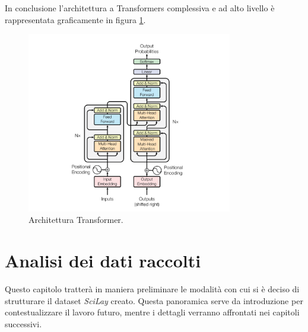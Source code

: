 \documentclass[12pt,a4paper,twoside,openright]{book}
\begin{document}
In conclusione l'architettura a Transformers complessiva e ad alto livello è rappresentata graficamente in figura \ref{fig:transformer}.

\begin{figure} 
    \centering
    \includegraphics[width=0.8\textwidth]{images/transformer.png}
    \caption{Architettura Transformer.}
    \label{fig:transformer}
\end{figure}

































\chapter{Analisi dei dati raccolti}\label{cap:analisi_dati}

Questo capitolo tratterà in maniera preliminare le modalità con cui si è deciso di strutturare il dataset \emph{SciLay} creato. Questa panoramica serve da introduzione per contestualizzare il lavoro futuro, mentre i dettagli verranno affrontati nei capitoli successivi. 
\end{document}
